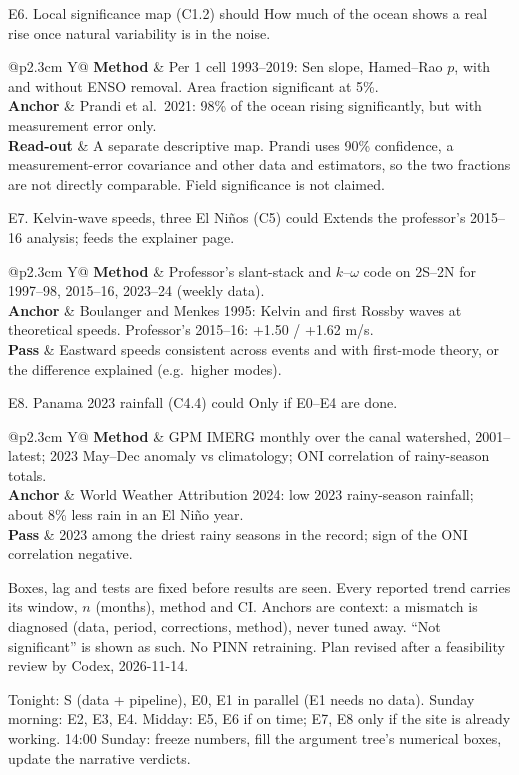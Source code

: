 \documentclass[10pt]{article}
\makeatletter
\newcommand{\row}[2]{\textbf{\sffamily\footnotesize #1} & #2\\}
\newcommand{\card}[1]{\begin{nubox}[]\begin{tabularx}{\linewidth}{@{}p{2.3cm} Y@{}}#1\end{tabularx}\end{nubox}}
\makeatother
\begin{document}
\begin{expbox}{E6. Local significance map (C1.2) \hfill should}
How much of the ocean shows a real rise once natural variability is in the noise.
\end{expbox}
\card{
\row{Method}{Per 1\textdegree{} cell 1993--2019: Sen slope, Hamed--Rao $p$, with and without ENSO removal. Area fraction significant at 5\%.}
\row{Anchor}{Prandi et al.\ 2021: 98\% of the ocean rising significantly, but with measurement error only.}
\row{Read-out}{A separate descriptive map. Prandi uses 90\% confidence, a measurement-error covariance and other data and estimators, so the two
fractions are not directly comparable. Field significance is not claimed.}
}

\begin{expbox}{E7. Kelvin-wave speeds, three El Ni\~nos (C5) \hfill could}
Extends the professor's 2015--16 analysis; feeds the explainer page.
\end{expbox}
\card{
\row{Method}{Professor's slant-stack and $k$--$\omega$ code on 2\textdegree S--2\textdegree N for 1997--98, 2015--16, 2023--24 (weekly data).}
\row{Anchor}{Boulanger and Menkes 1995: Kelvin and first Rossby waves at theoretical speeds. Professor's 2015--16: +1.50 / +1.62 m/s.}
\row{Pass}{Eastward speeds consistent across events and with first-mode theory, or the difference explained (e.g.\ higher modes).}
}

\begin{expbox}{E8. Panama 2023 rainfall (C4.4) \hfill could}
Only if E0--E4 are done.
\end{expbox}
\card{
\row{Method}{GPM IMERG monthly over the canal watershed, 2001--latest; 2023 May--Dec anomaly vs climatology; ONI correlation of rainy-season totals.}
\row{Anchor}{World Weather Attribution 2024: low 2023 rainy-season rainfall; about 8\% less rain in an El Ni\~no year.}
\row{Pass}{2023 among the driest rainy seasons in the record; sign of the ONI correlation negative.}
}

\begin{cabox}
Boxes, lag and tests are fixed before results are seen. Every reported trend carries its window, $n$ (months), method and CI. Anchors are
context: a mismatch is diagnosed (data, period, corrections, method), never tuned away. ``Not significant'' is shown as such. No PINN retraining.
Plan revised after a feasibility review by Codex, 2026-11-14.
\end{cabox}

\begin{cabox}
Tonight: S (data + pipeline), E0, E1 in parallel (E1 needs no data). Sunday morning: E2, E3, E4. Midday: E5, E6 if on time; E7, E8 only
if the site is already working. 14:00 Sunday: freeze numbers, fill the argument tree's numerical boxes, update the narrative verdicts.
\end{cabox}
\end{document}
